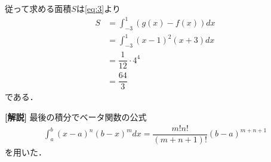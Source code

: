 \documentclass[../../main.tex]{subfiles}
\begin{document}
従って求める面積$S$は\cref{eq:3}より
\begin{align}
  S
  &=\int_{-3}^1(g(x)-f(x))dx \\
  &=\int_{-3}^1(x-1)^2(x+3)dx \\
  &=\dfrac{1}{12}\cdot4^4 \\
  &=\dfrac{64}{3}
\end{align}
である．

{\bf [解説]}
最後の積分でベータ関数の公式
\begin{align}
  \int_{a}^{b}(x-a)^n(b-x)^m dx = \dfrac{m!n!}{(m+n+1)!}\left(b-a\right)^{m+n+1}
\end{align}
を用いた．

\newpage
\end{document}
